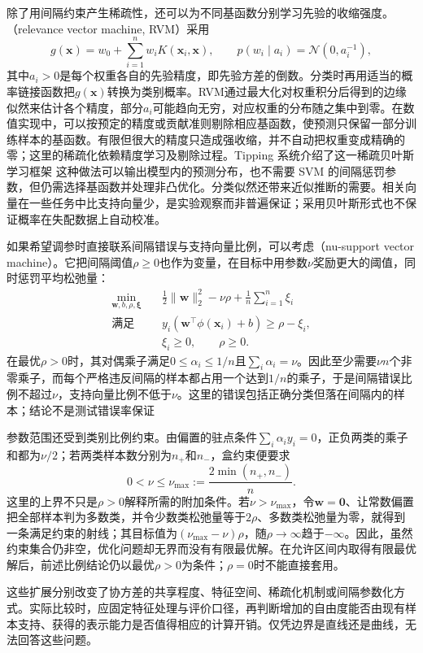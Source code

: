 除了用间隔约束产生稀疏性，还可以为不同基函数分别学习先验的收缩强度。（relevance vector machine, RVM）采用
\[
  g(\bm{x})=w_0+\sum_{i=1}^n w_i K(\bm{x}_i,\bm{x}),
  \qquad
  p(w_i\mid a_i)=\mathcal{N}(0,a_i^{-1}),
\]
其中$a_i>0$是每个权重各自的先验精度，即先验方差的倒数。分类时再用适当的概率链接函数把$g(\bm{x})$转换为类别概率。RVM通过最大化对权重积分后得到的边缘似然来估计各个精度，部分$a_i$可能趋向无穷，对应权重的分布随之集中到零。在数值实现中，可以按预定的精度或贡献准则剔除相应基函数，使预测只保留一部分训练样本的基函数。有限但很大的精度只造成强收缩，并不自动把权重变成精确的零；这里的稀疏化依赖精度学习及剔除过程。Tipping 系统介绍了这一稀疏贝叶斯学习框架
这种做法可以输出模型内的预测分布，也不需要 SVM 的间隔惩罚参数，但仍需选择基函数并处理非凸优化。分类似然还带来近似推断的需要。相关向量在一些任务中比支持向量少，是实验观察而非普遍保证；采用贝叶斯形式也不保证概率在失配数据上自动校准。

如果希望调参时直接联系间隔错误与支持向量比例，可以考虑（nu-support vector machine）。它把间隔阈值$\rho\geq0$也作为变量，在目标中用参数$\nu$奖励更大的阈值，同时惩罚平均松弛量：
\begin{equation}
  \begin{aligned}
    \min_{\bm{w},b,\rho,\bm{\xi}}\quad&
      \frac12\lVert\bm{w}\rVert_2^2-\nu\rho
      +\frac1n\sum_{i=1}^n\xi_i\\
    \text{满足}\quad&
      y_i(\bm{w}^{\top}\phi(\bm{x}_i)+b)\geq\rho-\xi_i,\\
    &\xi_i\geq0,\qquad \rho\geq0.
  \end{aligned}
  \label{eq:classification-nu-svm}
\end{equation}
在最优$\rho>0$时，其对偶乘子满足$0\leq\alpha_i\leq1/n$且$\sum_i\alpha_i=\nu$。因此至少需要$\nu n$个非零乘子，而每个严格违反间隔的样本都占用一个达到$1/n$的乘子，于是间隔错误比例不超过$\nu$，支持向量比例不低于$\nu$。这里的错误包括正确分类但落在间隔内的样本；结论不是测试错误率保证

参数范围还受到类别比例约束。由偏置的驻点条件$\sum_i\alpha_i y_i=0$，正负两类的乘子和都为$\nu/2$；若两类样本数分别为$n_+$和$n_-$，盒约束便要求
\[
  0<\nu\leq\nu_{\max}
  :=\frac{2\min(n_+,n_-)}{n}.
\]
这里的上界不只是$\rho>0$解释所需的附加条件。若$\nu>\nu_{\max}$，令$\bm{w}=\bm{0}$、让常数偏置把全部样本判为多数类，并令少数类松弛量等于$2\rho$、多数类松弛量为零，就得到一条满足约束的射线；其目标值为$(\nu_{\max}-\nu)\rho$，随$\rho\to\infty$趋于$-\infty$。因此，虽然约束集合仍非空，优化问题却无界而没有有限最优解。在允许区间内取得有限最优解后，前述比例结论仍以最优$\rho>0$为条件；$\rho=0$时不能直接套用。

这些扩展分别改变了协方差的共享程度、特征空间、稀疏化机制或间隔参数化方式。实际比较时，应固定特征处理与评价口径，再判断增加的自由度能否由现有样本支持、获得的表示能力是否值得相应的计算开销。仅凭边界是直线还是曲线，无法回答这些问题。
